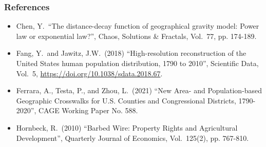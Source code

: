 \documentclass{beamer}
\begin{document}

\begin{frame}
\frametitle{References}

\begin{itemize}
    \item Chen, Y.\ ``The distance-decay function of geographical gravity model: Power law or exponential law?'', Chaos, Solutions \& Fractals, Vol.\ 77, pp. 174-189.
    \item Fang, Y.\ and Jawitz, J.W.\ (2018) ``High-resolution reconstruction of the United States human population distribution, 1790 to 2010'', Scientific Data, Vol.\ 5, \url{https://doi.org/10.1038/sdata.2018.67}.
    \item Ferrara, A., Testa, P., and Zhou, L.\ (2021) ``New Area- and Population-based Geographic Crosswalks for U.S. Counties and Congressional Districts, 1790-2020'', CAGE Working Paper No. 588.
    \item Hornbeck, R.\ (2010) ``Barbed Wire: Property Rights and Agricultural Development'', Quarterly Journal of Economics, Vol.\ 125(2), pp. 767-810.
\end{itemize}

\end{frame}

\end{document}
